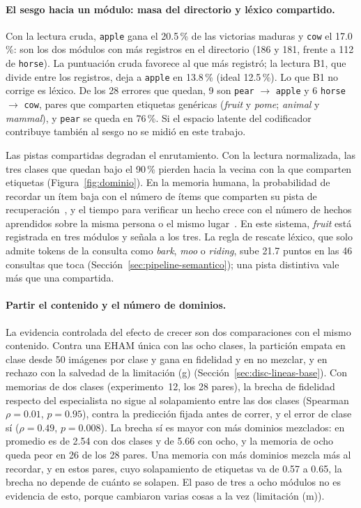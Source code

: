 \paragraph{El sesgo hacia un módulo: masa del directorio y léxico compartido.}
Con la lectura cruda, \texttt{apple} gana el 20.5\,\% de las victorias maduras y
\texttt{cow} el 17.0\,\%: son los dos módulos con más registros en el directorio (186 y
181, frente a 112 de \texttt{horse}).
La puntuación cruda favorece al que más registró; la
lectura B1, que divide entre los registros, deja a \texttt{apple} en 13.8\,\% (ideal
12.5\,\%).
Lo que B1 no corrige es léxico.
De los 28 errores que quedan, 9 son \texttt{pear} $\to$ \texttt{apple} y 6
\texttt{horse} $\to$ \texttt{cow}, pares que comparten etiquetas genéricas
(\textit{fruit} y \textit{pome}; \textit{animal} y \textit{mammal}), y \texttt{pear}
se queda en 76\,\%.
Si el espacio latente del codificador contribuye también al sesgo no se midió en este
trabajo.

Las pistas compartidas degradan el enrutamiento.
Con la lectura normalizada, las tres clases que quedan bajo el 90\,\% pierden hacia la
vecina con la que comparten etiquetas (Figura~\ref{fig:dominio}).
En la memoria humana, la probabilidad de recordar un ítem baja con el número de
ítems que comparten su pista de recuperación~\cite{watkins1975buildup}, y el tiempo
para verificar un hecho crece con el número de hechos aprendidos sobre la misma
persona o el mismo lugar~\cite{anderson1974retrieval}.
En este sistema, \textit{fruit} está registrada en tres módulos y señala a los tres.
La regla de rescate léxico, que solo admite tokens de la consulta como
\textit{bark}, \textit{moo} o \textit{riding}, sube 21.7 puntos en las 46 consultas
que toca (Sección~\ref{sec:pipeline-semantico}); una pista distintiva vale más que
una compartida.

\paragraph{Partir el contenido y el número de dominios.}
La evidencia controlada del efecto de crecer son dos comparaciones con el mismo
contenido.
Contra una EHAM única con las ocho clases, la partición empata en clase desde 50
imágenes por clase y gana en fidelidad y en no mezclar, y en rechazo con la salvedad de
la limitación (g) (Sección~\ref{sec:disc-lineas-base}).
Con memorias de dos clases (experimento~12, los 28 pares), la brecha de fidelidad
respecto del especialista no sigue al solapamiento entre las dos clases (Spearman
$\rho = 0.01$, $p = 0.95$), contra la predicción fijada antes de correr, y el error de
clase sí ($\rho = 0.49$, $p = 0.008$).
La brecha sí es mayor con más dominios mezclados: en promedio es de 2.54 con dos
clases y de 5.66 con ocho, y la memoria de ocho queda peor en 26 de los 28 pares.
Una memoria con más dominios mezcla más al recordar, y en estos pares, cuyo
solapamiento de etiquetas va de 0.57 a 0.65, la brecha no depende de cuánto se
solapen.
El paso de tres a ocho módulos no es evidencia de esto, porque cambiaron varias cosas a
la vez (limitación (m)).

